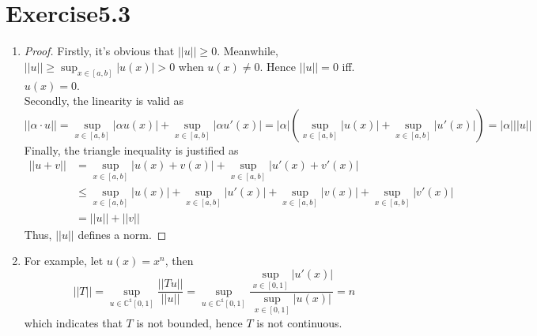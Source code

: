 \documentclass[paper=a4, fontsize=11pt]{scrartcl} %
\numberwithin{equation}{section} %
\numberwithin{figure}{section} %
\numberwithin{table}{section} %
\begin{document}
\section{Exercise5.3}
	\begin{enumerate}
		\item 
			\begin{proof}
				Firstly, it's obvious that $||u|| \geq 0$. Meanwhile, $||u|| \geq \sup_{x\in[a, b]} |u(x)| > 0$ when $u(x) \neq 0$. Hence $||u|| = 0$ iff. $u(x) = 0$.\\
				Secondly, the linearity is valid as
					\begin{equation}
						||\alpha \cdot u|| = \sup_{x\in[a, b]} |\alpha u(x)| + \sup_{x\in[a, b]} |\alpha u'(x)| = |\alpha| (\sup_{x\in[a, b]} |u(x)| + \sup_{x\in[a, b]} |u'(x)|) = |\alpha| ||u||
					\end{equation}
				Finally, the triangle inequality is justified as
					\begin{equation}
						\begin{aligned}
							||u+v|| & = \sup_{x\in[a, b]}|u(x)+v(x)| + \sup_{x\in[a, b]}|u'(x) + v'(x)|\\
							& \leq \sup_{x\in[a, b]} |u(x)| + \sup_{x\in[a, b]} |u'(x)| + \sup_{x\in[a, b]} |v(x)| + \sup_{x\in[a, b]} |v'(x)|\\
							& = ||u|| + ||v||
						\end{aligned}
					\end{equation}
				Thus, $||u||$ defines a norm.
			\end{proof}
		\item 
			 For example, let $u(x) = x^n$, then
			\begin{equation}
				||T|| = \sup_{u\in\mathbb{C^1}[0, 1]} \frac{||Tu||}{||u||} = \sup_{u\in\mathbb{C^1}[0, 1]} \frac{\sup_{x\in[0, 1]}|u'(x)|}{\sup_{x\in[0, 1]}|u(x)|} = n
			\end{equation}
			which indicates that $T$ is not bounded, hence $T$ is not continuous.
	\end{enumerate}
\end{document}

